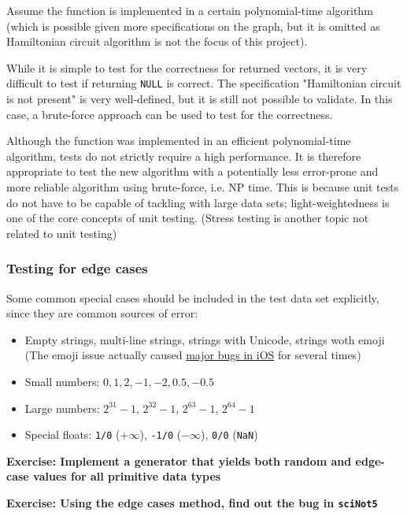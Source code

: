 Assume the function is implemented in a certain polynomial-time algorithm
(which is possible given more specifications on the graph,
but it is omitted as Hamiltonian circuit algorithm is not the focus of this project).

While it is simple to test for the correctness for returned vectors, it is very difficult to test if returning \texttt{NULL} is correct.
The specification "Hamiltonian circuit is not present" is very well-defined, but it is still not possible to validate.
In this case, a brute-force approach can be used to test for the correctness.

Although the function was implemented in an efficient polynomial-time algorithm, tests do not strictly require a high performance.
It is therefore appropriate to test the new algorithm
with a potentially less error-prone and more reliable algorithm using brute-force, i.e. NP time.
This is because unit tests do not have to be capable of tackling with large data sets;
light-weightedness is one of the core concepts of unit testing.
(Stress testing is another topic not related to unit testing)

\subsubsection{Testing for edge cases}
Some common special cases should be included in the test data set explicitly, since they are common sources of error:

\begin{itemize}
	\item Empty strings, multi-line strings, strings with Unicode, strings woth emoji (The emoji issue actually caused
		\href{http://mentalfloss.com/article/544039/how-get-past-iphone-crashing-death-emoji}{major bugs in iOS} for several times)
	\item Small numbers: $0, 1, 2, -1, -2, 0.5, -0.5$
	\item Large numbers: $2^{31}-1$, $2^{32}-1$, $2^{63}-1$, $2^{64}-1$
	\item Special floats: \texttt{1/0} ($+\infty$), \texttt{-1/0} ($-\infty$), \texttt{0/0} (\texttt{NaN})
\end{itemize}

\textbf{Exercise: Implement a generator that yields both random and edge-case values for all primitive data types}

\textbf{Exercise: Using the edge cases method, find out the bug in \texttt{sciNot5}}
